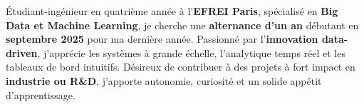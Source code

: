 \documentclass[]{deedy-resume-reversed}
\begin{document}

Étudiant-ingénieur en quatrième année à l’\textbf{EFREI Paris}, spécialisé en \textbf{Big Data et Machine Learning}, je cherche une \textbf{alternance d’un an} débutant en \textbf{septembre 2025} pour ma dernière année. Passionné par l’\textbf{innovation data-driven}, j’apprécie les systèmes à grande échelle, l’analytique temps réel et les tableaux de bord intuitifs. Désireux de contribuer à des projets à fort impact en \textbf{industrie ou R\&D}, j’apporte autonomie, curiosité et un solide appétit d’apprentissage.

\sectionsep
\end{document}
